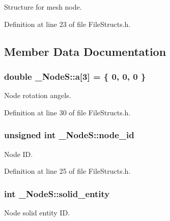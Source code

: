 Structure for mesh node. 

Definition at line 23 of file File\+Structs.\+h.



\subsection{Member Data Documentation}
\subsubsection[{\texorpdfstring{a}{a}}]{\setlength{\rightskip}{0pt plus 5cm}double \+\_\+\+Node\+S\+::a\mbox{[}3\mbox{]} = \{ 0, 0, 0 \}}\hypertarget{struct___node_s_a4af2fedf51326cedd3244b54a0684935}{}\label{struct___node_s_a4af2fedf51326cedd3244b54a0684935}


Node rotation angels. 



Definition at line 30 of file File\+Structs.\+h.

\subsubsection[{\texorpdfstring{node\+\_\+id}{node_id}}]{\setlength{\rightskip}{0pt plus 5cm}unsigned int \+\_\+\+Node\+S\+::node\+\_\+id}\hypertarget{struct___node_s_a03170eedacfbc42024a0e556858ead3f}{}\label{struct___node_s_a03170eedacfbc42024a0e556858ead3f}


Node ID. 



Definition at line 25 of file File\+Structs.\+h.

\subsubsection[{\texorpdfstring{solid\+\_\+entity}{solid_entity}}]{\setlength{\rightskip}{0pt plus 5cm}int \+\_\+\+Node\+S\+::solid\+\_\+entity}\hypertarget{struct___node_s_a9ded714a4c7575d4dc9c721f8560f861}{}\label{struct___node_s_a9ded714a4c7575d4dc9c721f8560f861}


Node solid entity ID. 



